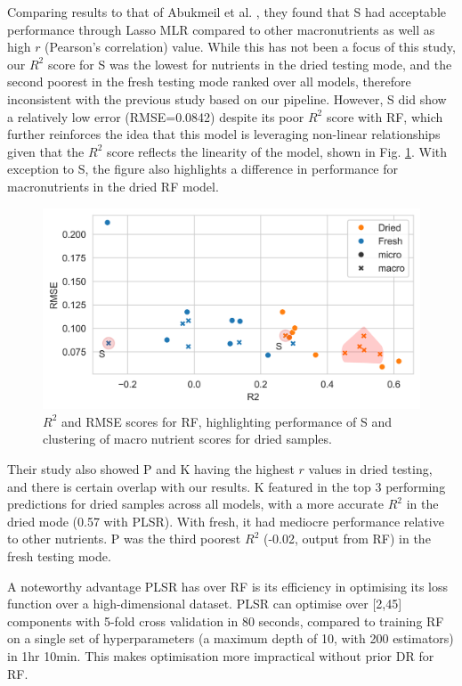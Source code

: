 \documentclass[conference]{IEEEtran}
\begin{document}
Comparing results to that of Abukmeil et al. \cite{Abukmeil2022}, they found that S had acceptable performance through Lasso MLR compared to other macronutrients as well as high $r$ (Pearson's correlation) value. While this has not been a focus of this study, our $R^2$ score for S was the lowest for nutrients in the dried testing mode, and the second poorest in the fresh testing mode ranked over all models, therefore inconsistent with the previous study based on our pipeline. However, S did show a relatively low error (RMSE=0.0842) despite its poor $R^2$ score with RF, which further reinforces the idea that this model is leveraging non-linear relationships given that the $R^2$ score reflects the linearity of the model, shown in Fig. \ref{rf_r2_rmse_comparison}. With exception to S, the figure also highlights a difference in performance for macronutrients in the dried RF model.
\begin{figure}[ht!]
\centering
\includegraphics[width=\columnwidth]{Figures/RF_R2_RMSE.png}
\caption{$R^2$ and RMSE scores for RF, highlighting performance of S and  clustering of macro nutrient scores for dried samples.}
\label{rf_r2_rmse_comparison}
\end{figure}
Their study also showed P and K having the highest $r$ values in dried testing, and there is certain overlap with our results. K featured in the top 3 performing predictions for dried samples across all models, with a more accurate $R^2$ in the dried mode (0.57 with PLSR). With fresh, it had mediocre performance relative to other nutrients. P was the third poorest $R^2$ (-0.02, output from RF) in the fresh testing mode.

A noteworthy advantage PLSR has over RF is its efficiency in optimising its loss function over a high-dimensional dataset. PLSR can optimise over [2,45] components with 5-fold cross validation in 80 seconds, compared to training RF on a single set of hyperparameters (a maximum depth of 10, with 200 estimators) in 1hr 10min. This makes optimisation more impractical without prior DR for RF.
\end{document}
